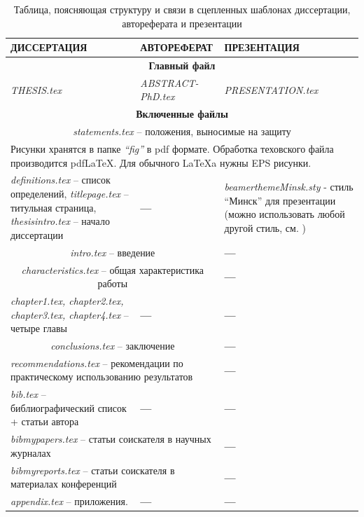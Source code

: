 \begin{table}[t]
\caption{Таблица, поясняющая структуру и связи в сцепленных шаблонах диссертации, автореферата и презентации}\label{table}
\begin{center}
\begin{tabular}{|p{58mm}|p{48mm}|p{49mm}|}
\hline
\large \bfseries ДИССЕРТАЦИЯ & \large \bfseries АВТОРЕФЕРАТ & \large \bfseries ПРЕЗЕНТАЦИЯ \\[2mm]
\hline
\multicolumn{3}{|c|}{\bfseries Главный файл}\\
\hline
\itshape THESIS.tex & \itshape ABSTRACT-PhD.tex & \itshape PRESENTATION.tex \\
\hline
\multicolumn{3}{|c|}{\bfseries Включенные файлы}\\
\hline
\multicolumn{3}{|c|}{\textit{statements.tex} -- положения, выносимые на защиту}\\
\hline
\multicolumn{3}{|p{16cm}|}{Рисунки хранятся в папке \textit{``fig''} в pdf формате. Обработка теховского файла производится pdfLaTeX. Для обычного LaTeXa нужны EPS рисунки.}\\
\hline
\textit{definitions.tex} -- список определений,
\newline \textit{titlepage.tex} -- титульная страница,
\newline \textit{thesisintro.tex} -- начало диссертации  &  \bfseries \large --- &
\textit{beamerthemeMinsk.sty} - стиль ``Минск'' для презентации (можно использовать любой другой стиль, см. \cite{beamer}) \\
\hline
\multicolumn{2}{|c|}{\textit{intro.tex} -- введение} & \bfseries \large --- \\
\hline
\multicolumn{2}{|c|}{\textit{characteristics.tex} -- общая характеристика работы} & \bfseries \large --- \\
\hline
\textit{chapter1.tex, chapter2.tex, chapter3.tex, chapter4.tex} -- четыре главы & \bfseries \large ---   & \bfseries \large --- \\
\hline
\multicolumn{2}{|c|}{\textit{conclusions.tex} -- заключение} & \bfseries \large --- \\
\hline
\multicolumn{2}{|p{11cm}|}{\textit{recommendations.tex} -- рекомендации по практическому использованию результатов} & \bfseries \large --- \\
\hline
\textit{bib.tex} -- библиографический список + статьи автора & \bfseries \large ---   & \bfseries \large --- \\
\hline
\multicolumn{2}{|p{11cm}|}{\textit{bibmypapers.tex} -- статьи соискателя в научных журналах} & \bfseries \large ---  \\
\hline
\multicolumn{2}{|p{11cm}|}{\textit{bibmyreports.tex} -- статьи соискателя в материалах конференций} & \bfseries \large ---  \\
\hline
\textit{appendix.tex} -- приложения.  & \bfseries \large ---   & \bfseries \large --- \\
\hline
\end{tabular}
\end{center}

\end{table}


